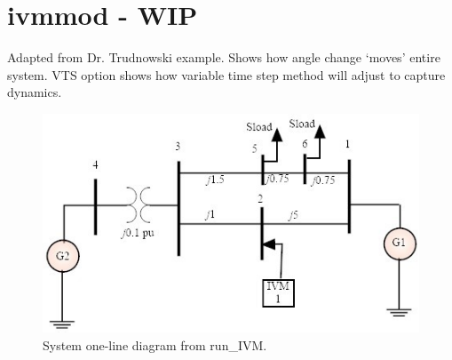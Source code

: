 \section{ivmmod - WIP} \label{sec: ivmmod ex}
Adapted from Dr. Trudnowski example.
Shows how angle change `moves' entire system.
VTS option shows how variable time step method will adjust to capture dynamics.

\begin{figure}[H]
	\centering
	\footnotesize
	\includegraphics[width=.85\linewidth]{examples/ivmmod/ivmOneLine}
	\caption{System one-line diagram from run\_IVM.}
	\label{fig: ivm oneline}
\end{figure}%

